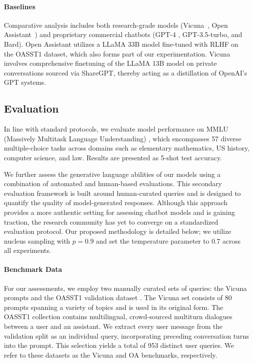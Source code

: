 \paragraph{Baselines}
Comparative analysis includes both research-grade models (Vicuna~\citep{vicuna2023}, Open Assistant~\citep{kopf2023openassistant}) and proprietary commercial chatbots (GPT-4 \citep{openai2023gpt}, GPT-3.5-turbo, and Bard). Open Assistant utilizes a LLaMA 33B model fine-tuned with RLHF on the OASST1 dataset, which also forms part of our experimentation. Vicuna involves comprehensive finetuning of the LLaMA 13B model on private conversations sourced via ShareGPT, thereby acting as a distillation of OpenAI’s GPT systems.

\subsection{Evaluation}

In line with standard protocols, we evaluate model performance on MMLU (Massively Multitask Language Understanding) \citep{hendrycksmeasuring}, which encompasses 57 diverse multiple-choice tasks across domains such as elementary mathematics, US history, computer science, and law. Results are presented as 5-shot test accuracy.

We further assess the generative language abilities of our models using a combination of automated and human-based evaluations. This secondary evaluation framework is built around human-curated queries and is designed to quantify the quality of model-generated responses. Although this approach provides a more authentic setting for assessing chatbot models and is gaining traction, the research community has yet to converge on a standardized evaluation protocol. Our proposed methodology is detailed below; we utilize nucleus sampling with $p=0.9$ and set the temperature parameter to $0.7$ across all experiments.

\paragraph{Benchmark Data} For our assessments, we employ two manually curated sets of queries: the Vicuna prompts \citep{vicuna2023} and the OASST1 validation dataset \citep{kopf2023openassistant}. The Vicuna set consists of 80 prompts spanning a variety of topics and is used in its original form. The OASST1 collection contains multilingual, crowd-sourced multiturn dialogues between a user and an assistant. We extract every user message from the validation split as an individual query, incorporating preceding conversation turns into the prompt. This selection yields a total of 953 distinct user queries. We refer to these datasets as the Vicuna and OA benchmarks, respectively.

